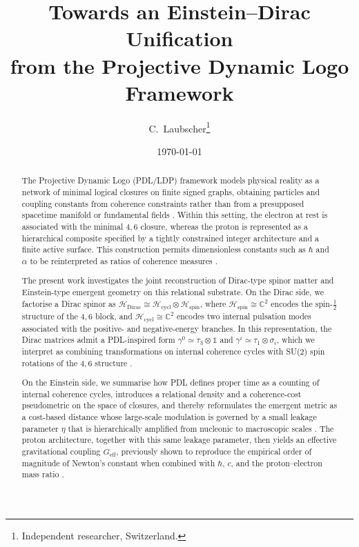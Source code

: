 \documentclass[11pt,a4paper]{article}
\theoremstyle{definition}
\newcommand{\Hspin}{\mathcal{H}_{\mathrm{spin}}}
\newcommand{\Hcycl}{\mathcal{H}_{\mathrm{cycl}}}
\newcommand{\HDirac}{\mathcal{H}_{\mathrm{Dirac}}}
\newcommand{\Geff}{G_{\mathrm{eff}}}
\newcommand{\etaL}{\eta} %
\begin{document}
\title{Towards an Einstein--Dirac Unification\\
from the Projective Dynamic Logo Framework}

\author{C.~Laubscher\thanks{Independent researcher, Switzerland.}\\[4pt]}

\date{\small \today}

\maketitle

\begin{abstract}
The Projective Dynamic Logo (PDL/LDP) framework models physical reality as a network of minimal logical closures on finite signed graphs, obtaining particles and coupling constants from coherence constraints rather than from a presupposed spacetime manifold or fundamental fields \cite{zenodo18462686,PDL_introduction,PDL}. Within this setting, the electron at rest is associated with the minimal $4,6$ closure, whereas the proton is represented as a hierarchical composite specified by a tightly constrained integer architecture and a finite active surface. This construction permits dimensionless constants such as $\hbar$ and $\alpha$ to be reinterpreted as ratios of coherence measures \cite{PDL,Derivation_alpha_PDL,Schodinger_PDL,Combinatorial_Proton_Architecture_PDL}. 

The present work investigates the joint reconstruction of Dirac-type spinor matter and Einstein-type emergent geometry on this relational substrate. On the Dirac side, we factorise a Dirac spinor as $\HDirac \cong \Hcycl \otimes \Hspin$, where $\Hspin \cong \mathbb{C}^2$ encodes the spin-$\tfrac{1}{2}$ structure of the $4,6$ block, and $\Hcycl \cong \mathbb{C}^2$ encodes two internal pulsation modes associated with the positive- and negative-energy branches. In this representation, the Dirac matrices admit a PDL-inspired form $\gamma^0 \simeq \tau_3 \otimes \mathbb{1}$ and $\gamma^i \simeq \tau_1 \otimes \sigma_i$, which we interpret as combining transformations on internal coherence cycles with SU(2) spin rotations of the $4,6$ structure \cite{Relational_Emergence_of_Born_s_Rule_and_a_Golden_Ratio_Active_Surface_in_PDL,Toward_a_Gleason_Type_Uniqueness_Theorem_for_Born_s_Rule_in_the_PDL_Framework}. 

On the Einstein side, we summarise how PDL defines proper time as a counting of internal coherence cycles, introduces a relational density and a coherence-cost pseudometric on the space of closures, and thereby reformulates the emergent metric as a cost-based distance whose large-scale modulation is governed by a small leakage parameter $\etaL$ that is hierarchically amplified from nucleonic to macroscopic scales \cite{A_Topological_Reformulation_in_the_Projective_Dynamic_Logo_Framework_Hierarchical_Coherence_Filtering_and_the_Exponent_18_in_PDL,zenodo18462686}. The proton architecture, together with this same leakage parameter, then yields an effective gravitational coupling $\Geff$, previously shown to reproduce the empirical order of magnitude of Newton’s constant when combined with $\hbar$, $c$, and the proton–electron mass ratio \cite{PDL,zenodo18462686}. 


\end{abstract}
\end{document}
